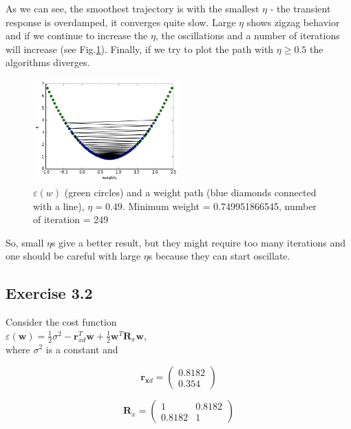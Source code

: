 \documentclass[a4paper, 12pt]{article}
\begin{document}
As we can see, the smoothest trajectory is with the smallest $\eta$ - the transient response is overdamped, it converges quite slow. Large $\eta$ shows zigzag behavior and if we continue to increase the $\eta$, the oscillations and a number of iterations will increase (see Fig.\ref{fig:EFunction049}). Finally, if we try to plot the path with $\eta \geqslant 0.5$ the algorithms diverges.

\begin{figure}[h]
  \centering
  \caption{$\varepsilon(w)$ (green circles) and a weight path (blue diamonds connected with a line), $\eta = 0.49$. Minimum weight = 0.749951866545, number of iteration = 249  \label{fig:EFunction049}}
  \includegraphics[width=0.5\textwidth]{EFunction049}
\end{figure}

So, small $\eta$s give a better result, but they might require too many iterations and one should be careful with large $\eta$s because they can start oscillate.\\

\cleardoublepage	

\subsection{Exercise 3.2}

Consider the cost function\\
$\varepsilon(\boldsymbol{w}) = \frac{1}{2} \sigma^2 - \boldsymbol{\boldsymbol{r}}_{xd}^T\boldsymbol{w} + \frac{1}{2}\boldsymbol{w}^T\boldsymbol{R}_x\boldsymbol{w}$,\\

where $\sigma^2$ is a constant and

\[\boldsymbol{r}_{\boldsymbol{x}d} = \left( \begin{array}{ccc}
0.8182 \\
0.354 \end{array} \right)\]

\[\boldsymbol{R}_x = \left( \begin{array}{ccc}
1 & 0.8182 \\
0.8182  & 1 \end{array} \right)\]
\end{document}
